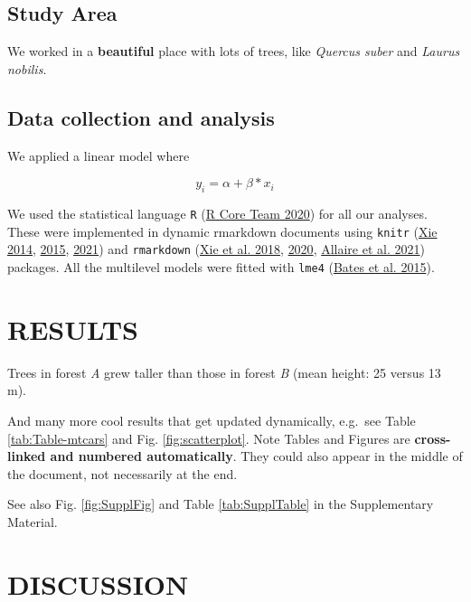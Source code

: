 \documentclass[
  11pt,
  a4paper,
]{article}
\begin{document}
\hypertarget{study-area}{%
\subsection{Study Area}\label{study-area}}

We worked in a \textbf{beautiful} place with lots of trees, like \emph{Quercus suber} and \emph{Laurus nobilis}.

\hypertarget{data-collection-and-analysis}{%
\subsection{Data collection and analysis}\label{data-collection-and-analysis}}

We applied a linear model where

\[
y_{i} = \alpha + \beta*x_{i} 
\]

We used the statistical language \texttt{R} (\protect\hyperlink{ref-R_Core_Team_2020}{R Core Team 2020}) for all our analyses. These were implemented in dynamic rmarkdown documents using \texttt{knitr} (\protect\hyperlink{ref-Xie_2014}{Xie 2014}, \protect\hyperlink{ref-Xie_2015}{2015}, \protect\hyperlink{ref-Xie_2021}{2021}) and \texttt{rmarkdown} (\protect\hyperlink{ref-Xie_2018}{Xie et al. 2018}, \protect\hyperlink{ref-Xie_2020}{2020}, \protect\hyperlink{ref-Allaire_2021}{Allaire et al. 2021}) packages. All the multilevel models were fitted with \texttt{lme4} (\protect\hyperlink{ref-Bates_2015}{Bates et al. 2015}).

\hypertarget{results}{%
\section{RESULTS}\label{results}}

Trees in forest \emph{A} grew taller than those in forest \emph{B} (mean height: 25 versus 13 m).

And many more cool results that get updated dynamically, e.g.~see Table \ref{tab:Table-mtcars} and Fig. \ref{fig:scatterplot}. Note Tables and Figures are \textbf{cross-linked and numbered automatically}. They could also appear in the middle of the document, not necessarily at the end.

See also Fig. \ref{fig:SupplFig} and Table \ref{tab:SupplTable} in the Supplementary Material.

\hypertarget{discussion}{%
\section{DISCUSSION}\label{discussion}}
\end{document}
